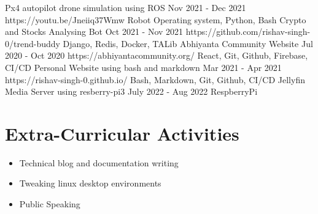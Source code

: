 \documentclass[paper=a4, fontsize=10pt]{my-resume}
\begin{document}
{     \project
        {Px4 autopilot drone simulation using ROS}
        {Nov 2021 - Dec 2021}
        {https://youtu.be/Jneiiq37Wmw}
        {Robot Operating system, Python, Bash}
        {
        }
     \project
        {Crypto and Stocks Analysing Bot}
        {Oct 2021 - Nov 2021}
        {https://github.com/rishav-singh-0/trend-buddy}
        {Django, Redis, Docker, TALib}
        {
        }
     \project
        {Abhiyanta Community Website}
        {Jul 2020 - Oct 2020}
        {https://abhiyantacommunity.org/}
        {React, Git, Github, Firebase, CI/CD}
        {
        }
     \project
        {Personal Website using bash and markdown}
        {Mar 2021 - Apr 2021}
        {https://rishav-singh-0.github.io/}
        {Bash, Markdown, Git, Github, CI/CD}
        {
        }
     \project
        {Jellyfin Media Server using resberry-pi3}
        {July 2022 - Aug 2022}
        {}
        {RespberryPi}
        {}

    \section[\faPencil]{Extra-Curricular Activities}
     \begin{itemize}
         \item Technical blog and documentation writing
         \item Tweaking linux desktop environments
         \item Public Speaking
     \end{itemize}

}
\makebody
\clearpage
\end{document}
